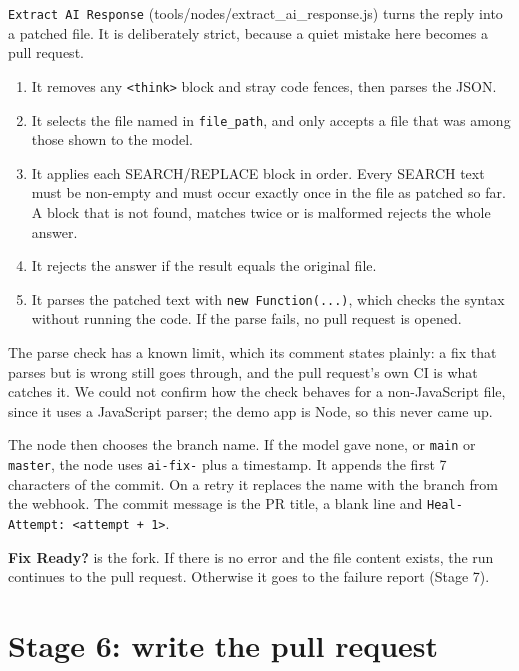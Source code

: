 \texttt{Extract AI Response} (tools/\allowbreak{}nodes/\allowbreak{}extract\_\allowbreak{}ai\_\allowbreak{}response.js) turns the reply into a patched file. It is deliberately strict, because a quiet mistake here becomes a pull request.

\begin{enumerate}[leftmargin=*, itemsep=2pt]
\item It removes any \texttt{\textless{}think\textgreater{}} block and stray code fences, then parses the JSON.
\item It selects the file named in \texttt{file\_\allowbreak{}path}, and only accepts a file that was among those shown to the model.
\item It applies each SEARCH/\allowbreak{}REPLACE block in order. Every SEARCH text must be non-empty and must occur exactly once in the file as patched so far. A block that is not found, matches twice or is malformed rejects the whole answer.
\item It rejects the answer if the result equals the original file.
\item It parses the patched text with \texttt{new Function(.\allowbreak{}.\allowbreak{}.\allowbreak{})}, which checks the syntax without running the code. If the parse fails, no pull request is opened.
\end{enumerate}

The parse check has a known limit, which its comment states plainly: a fix that parses but is wrong still goes through, and the pull request's own CI is what catches it. We could not confirm how the check behaves for a non-JavaScript file, since it uses a JavaScript parser; the demo app is Node, so this never came up.

The node then chooses the branch name. If the model gave none, or \texttt{main} or \texttt{master}, the node uses \texttt{ai-\allowbreak{}fix-\allowbreak{}} plus a timestamp. It appends the first 7 characters of the commit. On a retry it replaces the name with the branch from the webhook. The commit message is the PR title, a blank line and \texttt{Heal-\allowbreak{}Attempt:\allowbreak{} \textless{}attempt + 1\textgreater{}}.

\textbf{Fix Ready?} is the fork. If there is no error and the file content exists, the run continues to the pull request. Otherwise it goes to the failure report (Stage 7).

\section{Stage 6: write the pull request}

